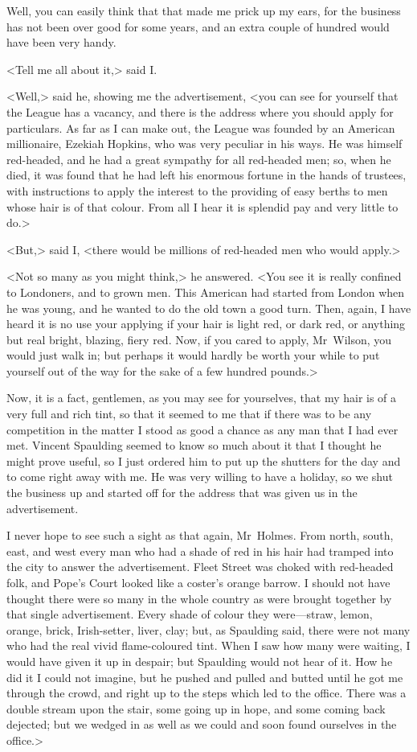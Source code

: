 Well, you can easily think that that made me prick up my ears, for the business has not been over good for some years, and an extra couple of hundred would have been very handy.

<Tell me all about it,> said I\@.

<Well,> said he, showing me the advertisement, <you can see for yourself that the League has a vacancy, and there is the address where you should apply for particulars. As far as I can make out, the League was founded by an American millionaire, Ezekiah Hopkins, who was very peculiar in his ways. He was himself red-headed, and he had a great sympathy for all red-headed men; so, when he died, it was found that he had left his enormous fortune in the hands of trustees, with instructions to apply the interest to the providing of easy berths to men whose hair is of that colour. From all I hear it is splendid pay and very little to do.>

<But,> said I, <there would be millions of red-headed men who would apply.>

<Not so many as you might think,> he answered. <You see it is really confined to Londoners, and to grown men. This American had started from London when he was young, and he wanted to do the old town a good turn. Then, again, I have heard it is no use your applying if your hair is light red, or dark red, or anything but real bright, blazing, fiery red. Now, if you cared to apply, Mr~Wilson, you would just walk in; but perhaps it would hardly be worth your while to put yourself out of the way for the sake of a few hundred pounds.>

Now, it is a fact, gentlemen, as you may see for yourselves, that my hair is of a very full and rich tint, so that it seemed to me that if there was to be any competition in the matter I stood as good a chance as any man that I had ever met. Vincent Spaulding seemed to know so much about it that I thought he might prove useful, so I just ordered him to put up the shutters for the day and to come right away with me. He was very willing to have a holiday, so we shut the business up and started off for the address that was given us in the advertisement.

I never hope to see such a sight as that again, Mr~Holmes. From north, south, east, and west every man who had a shade of red in his hair had tramped into the city to answer the advertisement. Fleet Street was choked with red-headed folk, and Pope's Court looked like a coster's orange barrow. I should not have thought there were so many in the whole country as were brought together by that single advertisement. Every shade of colour they were—straw, lemon, orange, brick, Irish-setter, liver, clay; but, as Spaulding said, there were not many who had the real vivid flame-coloured tint. When I saw how many were waiting, I would have given it up in despair; but Spaulding would not hear of it. How he did it I could not imagine, but he pushed and pulled and butted until he got me through the crowd, and right up to the steps which led to the office. There was a double stream upon the stair, some going up in hope, and some coming back dejected; but we wedged in as well as we could and soon found ourselves in the office.>


